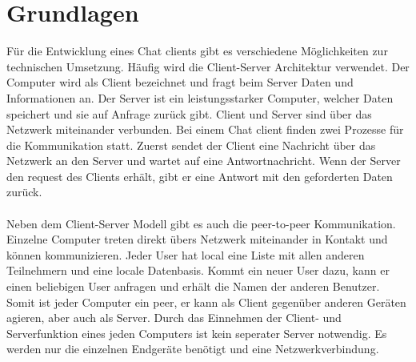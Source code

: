\section{Grundlagen}
Für die Entwicklung eines Chat clients gibt es verschiedene Möglichkeiten zur technischen Umsetzung.
Häufig wird die Client-Server Architektur verwendet. 
Der Computer wird als Client bezeichnet und fragt beim Server Daten und Informationen an. 
Der Server ist ein leistungsstarker Computer, welcher Daten speichert und sie auf Anfrage zurück gibt.
Client und Server sind über das Netzwerk miteinander verbunden. 
Bei einem Chat client finden zwei Prozesse für die Kommunikation statt.
Zuerst sendet der Client eine Nachricht über das Netzwerk an den Server und wartet auf eine Antwortnachricht. 
Wenn der Server den request des Clients erhält, gibt er eine Antwort mit den geforderten Daten zurück. 
\\
\\
Neben dem Client-Server Modell gibt es auch die peer-to-peer Kommunikation.
Einzelne Computer treten direkt übers Netzwerk miteinander in Kontakt und können kommunizieren. 
Jeder User hat local eine Liste mit allen anderen Teilnehmern und eine locale Datenbasis. 
Kommt ein neuer User dazu, kann er einen beliebigen User anfragen und erhält die Namen der anderen Benutzer. 
Somit ist jeder Computer ein peer, er kann als Client gegenüber anderen Geräten agieren, aber auch als Server.
Durch das Einnehmen der Client- und Serverfunktion eines jeden Computers ist kein seperater Server notwendig.
Es werden nur die einzelnen Endgeräte benötigt und eine Netzwerkverbindung.


